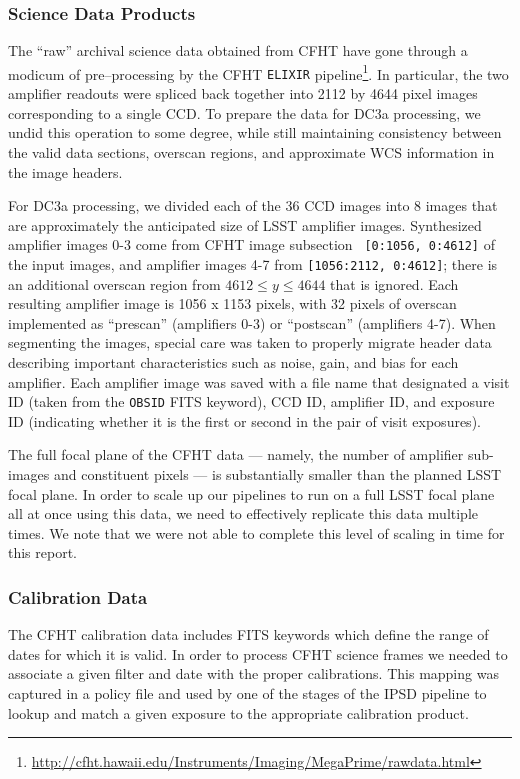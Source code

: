 \subsubsection{Science Data Products}

The ``raw'' archival science data obtained from CFHT have gone through
a modicum of pre--processing by the CFHT {\tt ELIXIR}
pipeline\footnote{\url{http://cfht.hawaii.edu/Instruments/Imaging/MegaPrime/rawdata.html}}.
In particular, the two amplifier readouts were spliced back together
into 2112 by 4644 pixel images corresponding to a single CCD.  To
prepare the data for DC3a processing, we undid this operation to some
degree, while still maintaining consistency between the valid data
sections, overscan regions, and approximate WCS information in the
image headers. 

For DC3a processing, we divided each of the 36 CCD images into 8 images
that are approximately the anticipated size of LSST amplifier images.
Synthesized amplifier images 0-3 come from CFHT image subsection {\tt
[0:1056, 0:4612]} of the input images, and amplifier images 4-7 from
{\tt [1056:2112, 0:4612]}; there is an additional overscan region from
$4612 \leq y \leq 4644$ that is ignored.  Each resulting amplifier
image is 1056 x 1153 pixels, with 32 pixels of overscan implemented as
``prescan'' (amplifiers 0-3) or ``postscan'' (amplifiers 4-7).  
When segmenting the images, special care was taken to properly migrate
header data describing important characteristics such as noise, gain,
and bias for each amplifier.  Each amplifier image was saved with a
file name that designated a visit ID (taken from the \texttt{OBSID} FITS
keyword), CCD ID, amplifier ID, and exposure ID (indicating whether it
is the first or second in the pair of visit exposures).  

The full focal plane of the CFHT data --- namely, the number of amplifier
sub-images and constituent pixels --- is substantially smaller than
the planned LSST focal plane.  In order to scale up our pipelines to
run on a full LSST focal plane all at once using this data, we need to
effectively replicate this data multiple times.  We note that we were
not able to complete this level of scaling in time for this report.  

\subsubsection{Calibration Data}

The CFHT calibration data includes FITS keywords which define the range
of dates for which it is valid.  In order to process CFHT science frames
we needed to associate a given filter and date with the proper
calibrations.  This mapping was captured in a policy file and used by
one of the stages of the IPSD pipeline to lookup and match a given
exposure to the appropriate calibration product.  

